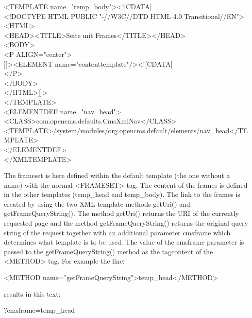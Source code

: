 \begin{xml}
<TEMPLATE name="temp\_body"><![CDATA[\\
\xtaba <!DOCTYPE HTML PUBLIC "-//W3C//DTD HTML 4.0 Transitional//EN">\\
\xtaba <HTML>\\
\xtaba   <HEAD><TITLE>Seite mit Frames</TITLE></HEAD>\\
\xtaba   <BODY>\\
\xtabb     <P ALIGN="center">\\
\xtabb       ]]><ELEMENT name="contenttemplate"/><![CDATA[\\
\xtabb     </P>\\
\xtaba   </BODY>\\
\xtaba </HTML>]]>\\
</TEMPLATE>\\

<ELEMENTDEF name="nav\_head">\\
\xtaba <CLASS>com.opencms.defaults.CmsXmlNav</CLASS>\\
\xtaba <TEMPLATE>/system/modules/org.opencms.default/elements/nav\_head</TEMPLATE> \\
</ELEMENTDEF>\\

</XMLTEMPLATE>\\
\end{xml}


The frameset is here defined within the default template (the one
without a name) with the normal {\tag <FRAMESET>} tag. The content
of the frames is defined in the other templates (temp\_head and temp\_body).
The link to the frames is created by using the two XML template methods
{\meth getUri()} and {\meth getFrameQueryString()}. The method
{\meth getUri()} returns the URI of the currently requested page
and the method {\meth getFrameQueryString()} returns the original query string
of the request together with an additional parameter {\name cmsframe}
which determines what template is to be used. The value of the
cmsframe parameter is passed to the {\meth getFrameQueryString()} method
as the tagcontent of the {\tag <METHOD>} tag. For example the 
line:

\begin{xml}
<METHOD name="getFrameQueryString">temp\_head</METHOD>\\
\end{xml}

results in this text:
\begin{xml}
?cmsframe=temp\_head
\end{xml}

